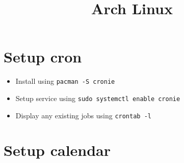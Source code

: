 \documentclass{../template/texnote}
\title{Arch Linux}
\begin{document}
    \maketitle {}
\section{Setup cron}
	\begin{itemize}
		\item Install using \texttt{pacman -S cronie}
		\item Setup service using \texttt{sudo systemctl enable cronie}
		\item Display any existing jobs using \texttt{crontab -l}
	\end{itemize}
\section{Setup calendar}
    \printbibliography
\end{document}
